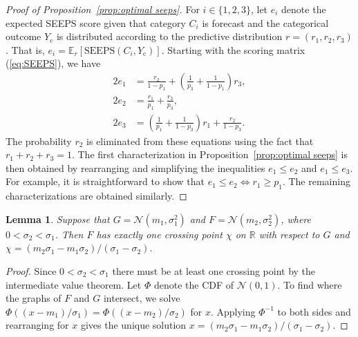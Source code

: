 \documentclass[10pt]{article} %
\theoremstyle{theorem}
\newtheorem{lem}{Lemma}
\theoremstyle{definition}
\newcommand{\RRR}{\mathbb{R}}
\newcommand{\EEE}{\mathbb{E}}
\newcommand{\SEEPS}{\mathrm{SEEPS}}
\newcommand{\cN}{\mathcal{N}}
\begin{document}
\begin{proof}[Proof of Proposition~\ref{prop:optimal seeps}]
For $i\in\{1,2,3\}$, let $e_i$ denote the expected SEEPS score given that category $C_i$ is forecast and the categorical outcome $Y_\mathrm{c}$ is distributed according to the predictive distribution $r=(r_1,r_2,r_3)$. That is, $e_i=\EEE_r[\SEEPS(C_i,Y_\mathrm{c})]$. 
Starting with the scoring matrix (\ref{eq:SEEPS}), we have
\begin{align*}
2e_1 &= \frac{r_2}{1 - p_1} + \left( \frac{1}{p_3} + \frac{1}{1 - p_1} \right) r_3, \\
2e_2 &= \frac{r_1}{p_1} + \frac{r_3}{p_3}, \\
2e_3 &= \left( \frac{1}{p_1} + \frac{1}{1 - p_3} \right) r_1 + \frac{r_2}{1 - p_3}. 
\end{align*}
The probability $r_2$ is eliminated from these equations using the fact that $r_1 + r_2 + r_3 = 1$. The first characterization in Proposition~\ref{prop:optimal seeps} is then obtained by rearranging and simplifying the inequalities $e_1\leq e_2$ and $e_1\leq e_3$. For example, it is straightforward to show that $e_1\leq e_2 \iff r_1\geq p_1$. The remaining characterizations are obtained similarly.
\end{proof}



\begin{lem}\label{lem:crossing point for normal}
Suppose that $G=\cN(m_1,\sigma_1^2)$ and $F=\cN(m_2,\sigma_2^2)$, where $0<\sigma_2<\sigma_1$. Then $F$ has exactly one crossing point $\chi$ on $\RRR$ with respect to $G$ and $\chi=(m_2\sigma_1-m_1\sigma_2)/(\sigma_1-\sigma_2)$.
\end{lem}

\begin{proof}
Since $0<\sigma_2<\sigma_1$ there must be at least one crossing point by the intermediate value theorem. Let $\Phi$ denote the CDF of $\cN(0,1)$. To find where the graphs of $F$ and $G$ intersect, we solve $\Phi((x-m_1)/\sigma_1)=\Phi((x-m_2)/\sigma_2)$ for $x$. Applying $\Phi^{-1}$ to both sides and rearranging for $x$ gives the unique solution $x=(m_2\sigma_1-m_1\sigma_2)/(\sigma_1-\sigma_2)$.
\end{proof}





\end{document}
